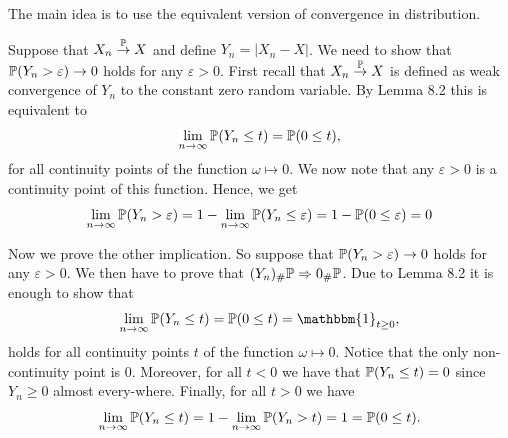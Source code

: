 
The main idea is to use the equivalent version of convergence in distribution.

Suppose that $X_n \stackrel{\mathbb P}{\rightarrow} X$ and define $Y_n = |X_n - X|$. We need to show that $\mathbb P(Y_n > \varepsilon) \to 0$ holds for any $\varepsilon > 0$. First recall that $X_n \stackrel{\mathbb P}{\rightarrow} X$ is defined as weak convergence of $Y_n$ to the constant zero random variable. By Lemma 8.2 this is equivalent to 
\[
	\lim_{n \to \infty} \mathbb P(Y_n \le t) = \mathbb P(0 \le t),
\]
for all continuity points of the function $\omega \mapsto 0$. We now note that any $\varepsilon > 0$ is a continuity point of this function. Hence, we get
\[
	\lim_{n \to \infty} \mathbb P(Y_n > \varepsilon) = 1 - \lim_{n \to \infty} \mathbb P(Y_n \le \varepsilon) = 1 - \mathbb P(0 \le \varepsilon) = 0
\]

Now we prove the other implication. So suppose that $\mathbb P(Y_n > \varepsilon) \to 0$ holds for any $\varepsilon > 0$. We then have to prove that $(Y_n)_\# \mathbb P \Rightarrow 0_\# \mathbb P$. Due to Lemma 8.2 it is enough to show that
\[
	\lim_{n \to \infty} \bbP(Y_n \le t) = \bbP(0 \le t) = \mathbbm{1}_{t \ge 0},
\]
holds for all continuity points $t$ of the function $\omega \mapsto 0$. Notice that the only non-continuity point is $0$. Moreover, for all $t < 0$ we have that $\mathbb P(Y_n \le t) = 0$ since $Y_n \ge 0$ almost every-where. Finally, for all $t > 0$ we have
\[
	\lim_{n \to \infty} \mathbb P(Y_n \le t) = 1 - \lim_{n \to \infty} \mathbb P(Y_n > t) = 1 = \mathbb P(0 \le t). 
\]



